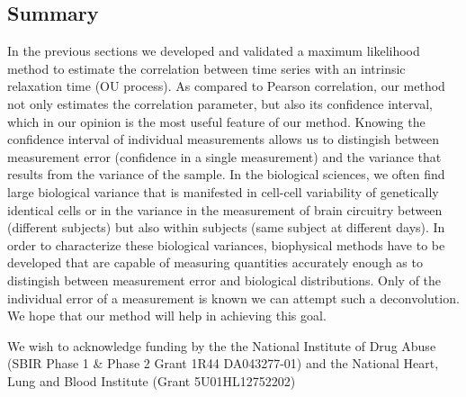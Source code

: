 \documentclass[%
 reprint,
 amsmath,amssymb,
 aps,
]{revtex4-1}
\begin{document}
\subsection{Summary}
In the previous sections we developed and validated a maximum likelihood method to estimate the correlation between time series with an intrinsic relaxation time (OU process).  As compared to Pearson correlation, our method not only estimates the correlation parameter, but also its confidence interval, which in our opinion is the most useful feature of our method.  Knowing the confidence interval of individual measurements allows us to distingish between measurement error (confidence in a single measurement) and the variance that results from the variance of the sample.  In the biological sciences, we often find large biological variance that is manifested in cell-cell variability of genetically identical cells or in the variance in the measurement of brain circuitry between (different subjects) but also within subjects (same subject at different days).  In order to characterize these biological variances, biophysical methods have to be developed that are capable of measuring quantities accurately enough as to distingish between measurement error and biological distributions.  Only of the individual error of a measurement is known we can attempt such a deconvolution.  We hope that our method will help in achieving this goal.
\begin{acknowledgments}
We wish to acknowledge funding by the the National Institute of Drug Abuse (SBIR Phase 1 \& Phase 2 Grant 1R44 DA043277-01) and the National Heart, Lung and Blood Institute (Grant 5U01HL12752202)
\end{acknowledgments}

\end{document}
